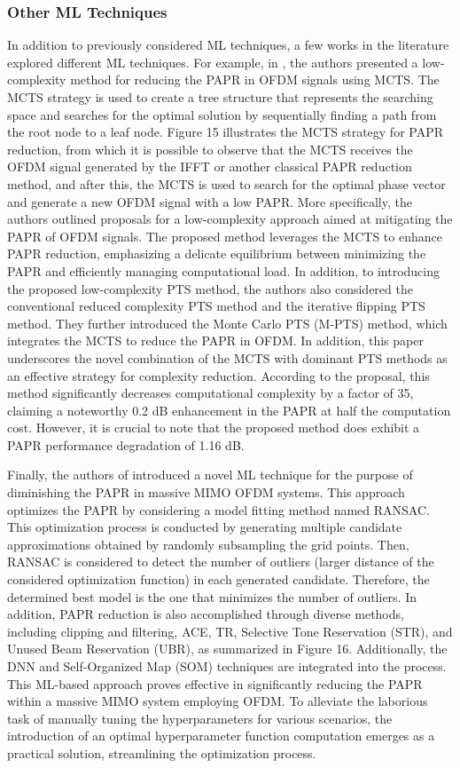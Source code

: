 \documentclass[conference]{IEEEtran}
\begin{document}
\subsubsection{Other ML Techniques \cite{b134, b155}}
In addition to previously considered ML techniques, a few works in the literature explored different ML techniques. For example, in \cite{b155}, the authors presented a low-complexity method for reducing the PAPR in OFDM signals using MCTS. The MCTS strategy is used to create a tree structure that represents the searching space and searches for the optimal solution by sequentially finding a path from the root node to a leaf node. Figure 15 illustrates the MCTS strategy for PAPR reduction, from which it is possible to observe that the MCTS receives the OFDM signal generated by the IFFT or another classical PAPR reduction method, and after this, the MCTS is used to search for the optimal phase vector and generate a new OFDM signal with a low PAPR. More specifically, the authors outlined proposals for a low-complexity approach aimed at mitigating the PAPR of OFDM signals. The proposed method leverages the MCTS to enhance PAPR reduction, emphasizing a delicate equilibrium between minimizing the PAPR and efficiently managing computational load. In addition, to introducing the proposed low-complexity PTS method, the authors also considered the conventional reduced complexity PTS method and the iterative flipping PTS method. They further introduced the Monte Carlo PTS (M-PTS) method, which integrates the MCTS to reduce the PAPR in OFDM. In addition, this paper underscores the novel combination of the MCTS with dominant PTS methods as an effective strategy for complexity reduction. According to the proposal, this method significantly decreases computational complexity by a factor of 35, claiming a noteworthy 0.2 dB enhancement in the PAPR at half the computation cost. However, it is crucial to note that the proposed method does exhibit a PAPR performance degradation of 1.16 dB.

Finally, the authors of \cite{b134} introduced a novel ML technique for the purpose of diminishing the PAPR in massive MIMO OFDM systems. This approach optimizes the PAPR by considering a model fitting method named RANSAC. This optimization process is conducted by generating multiple candidate approximations obtained by randomly subsampling the grid points. Then, RANSAC is considered to detect the number of outliers (larger distance of the considered optimization function) in each generated candidate. Therefore, the determined best model is the one that minimizes the number of outliers. In addition, PAPR reduction is also accomplished through diverse methods, including clipping and filtering, ACE, TR, Selective Tone Reservation (STR), and Unused Beam Reservation (UBR), as summarized in Figure 16. Additionally, the DNN and Self-Organized Map (SOM) techniques are integrated into the process. This ML-based approach proves effective in significantly reducing the PAPR within a massive MIMO system employing OFDM. To alleviate the laborious task of manually tuning the hyperparameters for various scenarios, the introduction of an optimal hyperparameter function computation emerges as a practical solution, streamlining the optimization process.
\end{document}
